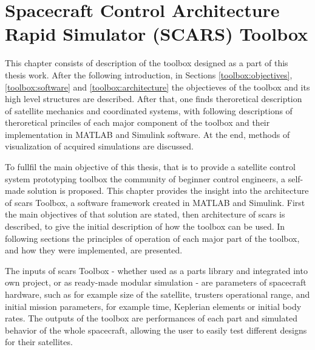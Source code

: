 \section{Spacecraft Control Architecture Rapid Simulator (SCARS) Toolbox}\label{sec:toolbox}
    This chapter consists of description of the toolbox designed as a part of this thesis work. After the following introduction, in Sections \ref{toolbox:objectives}, \ref{toolbox:software} and \ref{toolbox:architecture} the objectieves of the toolbox and its high level structures are described. After that, one finds theroretical description of satellite mechanics and coordinated systems, with following descriptions of theroretical princiles of each major component of the toolbox and their implementation in MATLAB and Simulink software. At the end, methods of visualization of acquired simulations are discussed.  

    To fullfil the main objective of this thesis, that is to provide a satellite control system prototyping toolbox the community of beginner control engineers, a self-made solution is proposed. This chapter provides the insight into the architecture of \ac*{scars} Toolbox, a software framework created in MATLAB and Simulink. First the main objectives of that solution are stated, then architecture of \ac{scars} is described, to give the initial description of how the toolbox can be used. In following sections the principles of operation of each major part of the toolbox, and how they were implemented, are presented.

    The inputs of \ac{scars} Toolbox - whether used as a parts library and integrated into own project, or as ready-made modular simulation - are parameters of spacecraft hardware, such as for example size of the satellite, trusters operational range, and initial mission parameters, for example time, Keplerian elements or initial body rates. The outputs of the toolbox are performances of each part and simulated behavior of the whole spacecraft, allowing the user to easily test different designs for their satellites.

